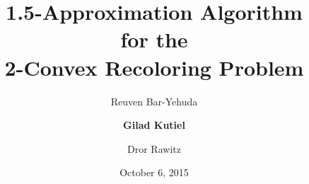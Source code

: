 \title{
1.5-Approximation Algorithm 
\\
for the 
\\
2-Convex Recoloring Problem
}

\author{
Reuven Bar-Yehuda
\and
\textbf{Gilad Kutiel}
\and
Dror Rawitz
}


\date{October 6, 2015}